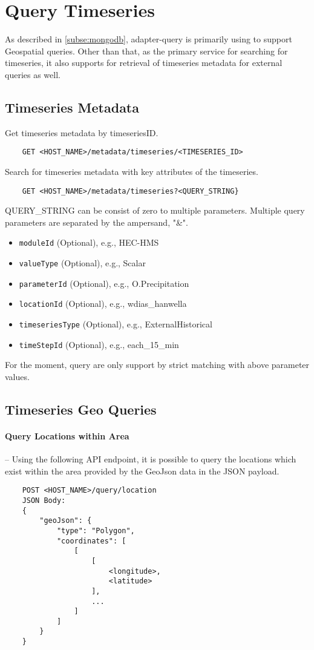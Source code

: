 \section{Query Timeseries}
\label{se:query}

As described in \cref{subse:mongodb}, adapter-query is primarily using to support Geospatial queries. Other than that, as the primary service for searching for timeseries, it also supports for retrieval of timeseries metadata for external queries as well.

\subsection{Timeseries Metadata}
Get timeseries metadata by timeseriesID.
\begin{lstlisting}
    GET <HOST_NAME>/metadata/timeseries/<TIMESERIES_ID>
\end{lstlisting}

Search for timeseries metadata with key attributes of the timeseries.
\begin{lstlisting}
    GET <HOST_NAME>/metadata/timeseries?<QUERY_STRING}
\end{lstlisting}

QUERY\_STRING can be consist of zero to multiple parameters. Multiple query parameters are separated by the ampersand, "\&".
\begin{itemize}
    \item \texttt{moduleId} (Optional), e.g., HEC-HMS
    \item \texttt{valueType} (Optional), e.g., Scalar
    \item \texttt{parameterId} (Optional), e.g., O.Precipitation
    \item \texttt{locationId} (Optional), e.g., wdias\_hanwella
    \item \texttt{timeseriesType} (Optional), e.g., ExternalHistorical
    \item \texttt{timeStepId} (Optional), e.g., each\_15\_min
\end{itemize}
For the moment, query are only support by strict matching with above parameter values.

\subsection{Timeseries Geo Queries}

\paragraph{Query Locations within Area}-- Using the following API endpoint, it is possible to query the locations which exist within the area provided by the GeoJson data in the JSON payload.
\begin{lstlisting}
    POST <HOST_NAME>/query/location
    JSON Body:
    {
        "geoJson": {
            "type": "Polygon",
            "coordinates": [
                [
                    [
                        <longitude>,
                        <latitude>
                    ],
                    ...
                ]
            ]
        }
    }
\end{lstlisting}

